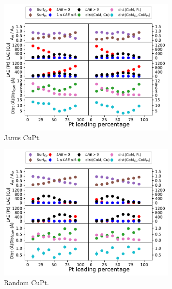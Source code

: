 \begin{figure}
    \centering
    \includegraphics[width=0.8\textwidth]{figures/MD/Alloys/Janus_Cu-Pt.pdf}
    \caption{Janus CuPt.}
    \label{fig:CuPtJan_Dyn}
\end{figure}

\begin{figure}
    \centering
    \includegraphics[width=0.8\textwidth]{figures/MD/Alloys/Random_Cu-Pt.pdf}
    \caption{Random CuPt.}
    \label{fig:CuPtRnd_Dyn}
\end{figure}

